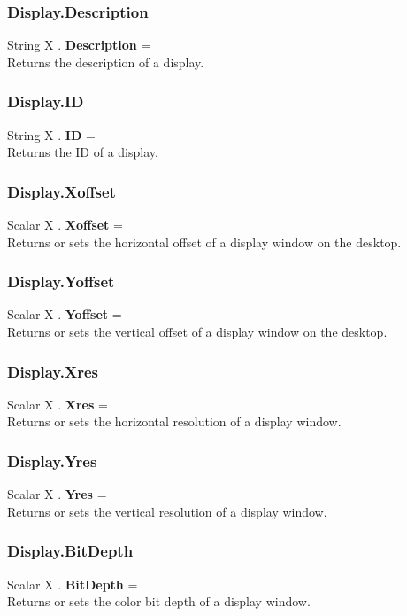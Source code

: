 \subsubsection{Display.Description \label{F:Display:Description}}
String X . \textbf{Description} = \\
Returns the description of a display.

\subsubsection{Display.ID \label{F:Display:ID}}
String X . \textbf{ID} = \\
Returns the ID of a display.

\subsubsection{Display.Xoffset \label{F:Display:Xoffset}}
Scalar X . \textbf{Xoffset} = \\
Returns or sets the horizontal offset of a display window on the desktop.

\subsubsection{Display.Yoffset \label{F:Display:Yoffset}}
Scalar X . \textbf{Yoffset} = \\
Returns or sets the vertical offset of a display window on the desktop.


\subsubsection{Display.Xres \label{F:Display:Xres}}
Scalar X . \textbf{Xres} = \\
Returns or sets the horizontal resolution of a display window.


\subsubsection{Display.Yres \label{F:Display:Yres}}
Scalar X . \textbf{Yres} = \\
Returns or sets the vertical resolution of a display window.


\subsubsection{Display.BitDepth \label{F:Display:BitDepth}}
Scalar X . \textbf{BitDepth} = \\
Returns or sets the color bit depth of a display window.


